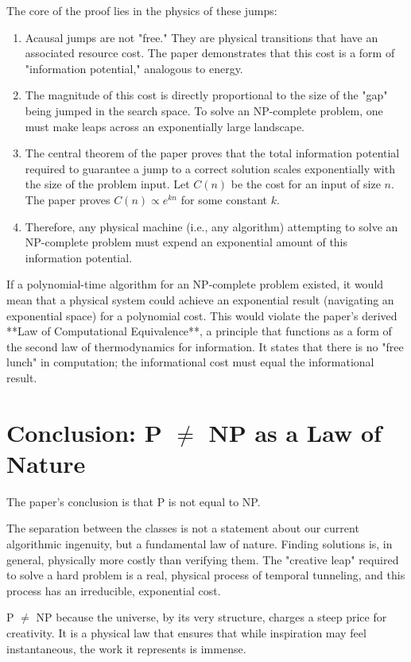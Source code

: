 \documentclass[12pt]{report}
\begin{document}
The core of the proof lies in the physics of these jumps:
\begin{enumerate}
    \item Acausal jumps are not "free." They are physical transitions that have an associated resource cost. The paper demonstrates that this cost is a form of "information potential," analogous to energy.
    \item The magnitude of this cost is directly proportional to the size of the "gap" being jumped in the search space. To solve an NP-complete problem, one must make leaps across an exponentially large landscape.
    \item The central theorem of the paper proves that the total information potential required to guarantee a jump to a correct solution scales exponentially with the size of the problem input. Let $C(n)$ be the cost for an input of size $n$. The paper proves $C(n) \propto e^{kn}$ for some constant $k$.
    \item Therefore, any physical machine (i.e., any algorithm) attempting to solve an NP-complete problem must expend an exponential amount of this information potential.
\end{enumerate}
If a polynomial-time algorithm for an NP-complete problem existed, it would mean that a physical system could achieve an exponential result (navigating an exponential space) for a polynomial cost. This would violate the paper's derived **Law of Computational Equivalence**, a principle that functions as a form of the second law of thermodynamics for information. It states that there is no "free lunch" in computation; the informational cost must equal the informational result.

\section{Conclusion: P $\neq$ NP as a Law of Nature}
The paper's conclusion is that P is not equal to NP.

The separation between the classes is not a statement about our current algorithmic ingenuity, but a fundamental law of nature. Finding solutions is, in general, physically more costly than verifying them. The "creative leap" required to solve a hard problem is a real, physical process of temporal tunneling, and this process has an irreducible, exponential cost.

P $\neq$ NP because the universe, by its very structure, charges a steep price for creativity. It is a physical law that ensures that while inspiration may feel instantaneous, the work it represents is immense.
\end{document}
